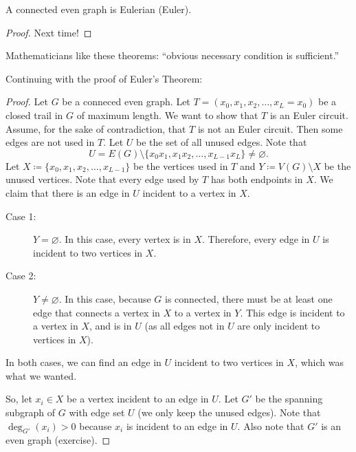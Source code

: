 \documentclass[a4paper]{article}
\begin{document}
\begin{theorem}
	A connected even graph is Eulerian (Euler).
\end{theorem}

\begin{proof}
	Next time!
\end{proof}

\begin{note}
	Mathematicians like these theorems: ``obvious necessary condition is sufficient.''
\end{note}


Continuing with the proof of Euler's Theorem:

\begin{proof}
	Let \( G \) be a conneced even graph. Let \( T = (x_{0}, x_{1}, x_{2}, \ldots , x_L = x_{0})\) be a closed trail in \( G \) of maximum length. We want to show that \( T \) is an Euler circuit. Assume, for the sake of contradiction, that \( T \) is not an Euler circuit. Then some edges are not used in \( T \). Let \( U \) be the set of all unused edges. Note that
	\[
		U = E(G) \setminus \{x_{0}x_{1}, x_{1}x_{2}, \ldots , x_{L-1}x_L\} \neq \varnothing
	.\] 
	Let \( X \coloneq \{x_{0}, x_{1}, x_{2}, \ldots , x_{L-1}\}   \) be the vertices used in \( T \) and \( Y \coloneqq V(G) \setminus X \) be the unused vertices. Note that every edge used by \( T \) has both endpoints in \( X \). We claim that there is an edge in \( U \) incident to a vertex in \( X \).
	\begin{description}
		\item[Case 1:]\( Y = \varnothing \). In this case, every vertex is in \( X \). Therefore, every edge in \( U \) is incident to two vertices in \( X \).
		\item[Case 2:] \( Y \neq \varnothing \). In this case, because \( G \) is connected, there must be at least one edge that connects a vertex in \( X \) to a vertex in \( Y \). This edge is incident to a vertex in \( X \), and is in \( U \) (as all edges not in \( U \) are only incident to vertices in \( X \)).
	\end{description}
	In both cases, we can find an edge in \( U \) incident to two vertices in \( X \), which was what we wanted. \par
	So, let \( x_i \in X \) be a vertex incident to an edge in \( U \). Let \( G' \) be the spanning subgraph of \( G \) with edge set \( U \) (we only keep the unused edges). Note that \( \deg_{G'}(x_i) > 0 \) because \( x_i \) is incident to an edge in \( U \). Also note that \( G' \) is an even graph (exercise). \par

\end{proof}
\end{document}
